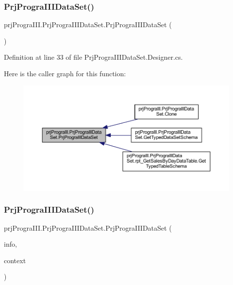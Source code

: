 \subsubsection{\texorpdfstring{Prj\+Progra\+I\+I\+I\+Data\+Set()}{PrjPrograIIIDataSet()}\hspace{0.1cm}{\footnotesize\ttfamily [1/2]}}
{\footnotesize\ttfamily prj\+Progra\+I\+I\+I.\+Prj\+Progra\+I\+I\+I\+Data\+Set.\+Prj\+Progra\+I\+I\+I\+Data\+Set (\begin{DoxyParamCaption}{ }\end{DoxyParamCaption})}



Definition at line 33 of file Prj\+Progra\+I\+I\+I\+Data\+Set.\+Designer.\+cs.

Here is the caller graph for this function\+:
\nopagebreak
\begin{figure}[H]
\begin{center}
\leavevmode
\includegraphics[width=350pt]{classprj_progra_i_i_i_1_1_prj_progra_i_i_i_data_set_a6f9d23a27fd935aa75948728c44e0ab7_icgraph}
\end{center}
\end{figure}
\hypertarget{classprj_progra_i_i_i_1_1_prj_progra_i_i_i_data_set_a77b5d9880ccd62a00c3daae6c0f13cc3}{}\label{classprj_progra_i_i_i_1_1_prj_progra_i_i_i_data_set_a77b5d9880ccd62a00c3daae6c0f13cc3} 
\subsubsection{\texorpdfstring{Prj\+Progra\+I\+I\+I\+Data\+Set()}{PrjPrograIIIDataSet()}\hspace{0.1cm}{\footnotesize\ttfamily [2/2]}}
{\footnotesize\ttfamily prj\+Progra\+I\+I\+I.\+Prj\+Progra\+I\+I\+I\+Data\+Set.\+Prj\+Progra\+I\+I\+I\+Data\+Set (\begin{DoxyParamCaption}\item[{global\+::\+System.\+Runtime.\+Serialization.\+Serialization\+Info}]{info,  }\item[{global\+::\+System.\+Runtime.\+Serialization.\+Streaming\+Context}]{context }\end{DoxyParamCaption})\hspace{0.3cm}{\ttfamily [protected]}}



